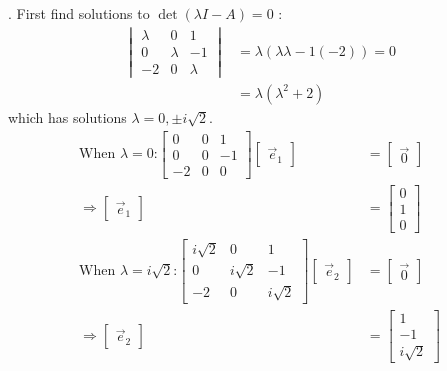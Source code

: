 \documentclass[11pt]{homework}
\begin{document}
. First find solutions to $\det (\lambda I - A) = 0 $ :
\begin{align*}
  \begin{vmatrix}
  \lambda & 0 & 1 \\
  0 & \lambda & -1 \\
  -2 & 0 & \lambda 
  \end{vmatrix}
  &= \lambda ( \lambda \lambda - 1 (-2)) =0 \\
  &= \lambda ( \lambda^2 +2)
\end{align*}
which has solutions $\lambda = 0, \pm i \sqrt{2}$.
\begin{align*}
\text{When $\lambda = 0$:}
  \begin{bmatrix}
  0 & 0 & 1 \\
  0 & 0 & -1 \\
  -2 & 0 & 0 
  \end{bmatrix} 
  \begin{bmatrix}
  \vec e_1
  \end{bmatrix}
  &=
  \begin{bmatrix}
  \vec 0
  \end{bmatrix} \\
\Rightarrow
  \begin{bmatrix}
  \vec e_1
  \end{bmatrix}
  &=
  \begin{bmatrix}
  0 \\
  1 \\  
  0
  \end{bmatrix} \\
\text{When $\lambda = i\sqrt{2}$:}
  \begin{bmatrix}
  i\sqrt{2} & 0 & 1 \\
  0 & i\sqrt{2} & -1 \\
  -2 & 0 & i\sqrt{2} 
  \end{bmatrix} 
  \begin{bmatrix}
  \vec e_2
  \end{bmatrix}
  &=
  \begin{bmatrix}
  \vec 0
  \end{bmatrix} \\
\Rightarrow
  \begin{bmatrix}
  \vec e_2
  \end{bmatrix}
  &=
  \begin{bmatrix}
  1 \\
  -1 \\
  i\sqrt{2} 
  \end{bmatrix} \\

\end{align*}
\end{document}
